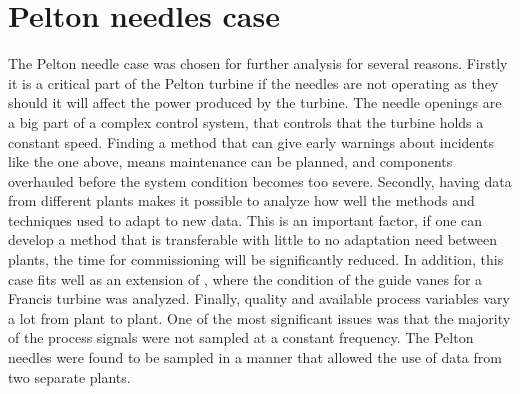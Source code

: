 \section{Pelton needles case}\label{sec:pelton_needles}
    The Pelton needle case was chosen for further analysis for several reasons. Firstly it is a critical part of the Pelton turbine if the needles are not operating as they should it will affect the power produced by the turbine. The needle openings are a big part of a complex control system, that controls that the turbine holds a constant speed. Finding a method that can give early warnings about incidents like the one above, means maintenance can be planned, and components overhauled before the system condition becomes too severe. Secondly, having data from different plants makes it possible to analyze how well the methods and techniques used to adapt to new data. This is an important factor, if one can develop a method that is transferable with little to no adaptation need between plants, the time for commissioning will be significantly reduced. In addition, this case fits well as an extension of \cite{Aasnes2017}, where the condition of the guide vanes for a Francis turbine was analyzed. Finally, quality and available process variables vary a lot from plant to plant. One of the most significant issues was that the majority of the process signals were not sampled at a constant frequency. The Pelton needles were found to be sampled in a manner that allowed the use of data from two separate plants.
             


